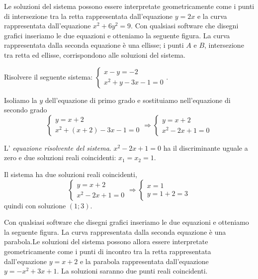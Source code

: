 \begin{exrig}
\begin{esempio}
\begin{multicols}{2}
Le soluzioni del sistema possono essere interpretate geometricamente come i 
punti di intersezione tra la retta rappresentata dall'equazione $y=2x$ e la 
curva rappresentata dall'equazione $x^2+6y^2=9$. Con qualsiasi software che 
disegni grafici inseriamo le due equazioni e otteniamo la seguente figura.
La curva rappresentata dalla seconda equazione è una ellisse; i punti $ A $ e $ 
B $, intersezione tra retta ed ellisse, corrispondono alle soluzioni del 
sistema.
\begin{center}

\end{center}
 \end{multicols}
\end{esempio}

\begin{esempio}
Risolvere il seguente sistema: $\left\{\begin{array}{l}x-y=-2 
\\x^2+y-3x-1=0\end{array}\right..$

Isoliamo la $y$ dell'equazione di primo grado e sostituiamo nell'equazione di 
secondo grado 
\[\left\{\begin{array}{l}y=x+2 \\
x^2+\left(x+2\right)-3x-1=0\end{array}\right. 
\Rightarrow\left\{\begin{array}{l}y=x+2 \\
x^2-2x+1=0\end{array}\right.\]

L' \emph{equazione risolvente del sistema}. $x^2-2x+1=0$ ha il discriminante 
uguale a zero e due soluzioni reali coincidenti: $x_1=x_2=1$.

Il sistema ha due soluzioni reali coincidenti, 
\[\left\{\begin{array}{l}y=x+2 \\x^2-2x+1=0\end{array}\right. 
\Rightarrow\left\{\begin{array}{l}x=1 \\
y=1+2=3\end{array}\right.\] 
quindi con soluzione $(1;3)$.
\begin{multicols}{2}
Con qualsiasi software che disegni grafici inseriamo le due equazioni e 
otteniamo la seguente figura.
La curva rappresentata dalla seconda equazione è una parabola.Le soluzioni del 
sistema possono allora essere interpretate geometricamente come i punti di 
incontro tra la retta rappresentata dall'equazione $y=x+2$ e la parabola 
rappresentata dall'equazione $y=-x^2+3x+1$. La soluzioni saranno due punti reali 
coincidenti. 


\end{multicols}
\end{esempio}
\end{exrig}
